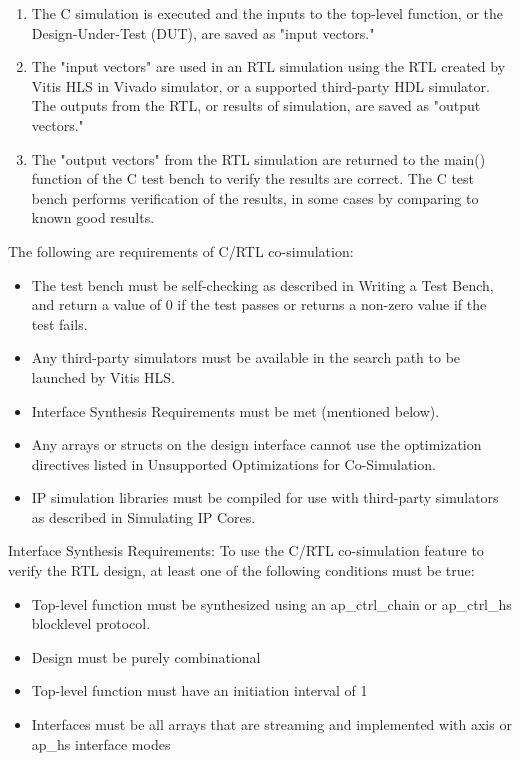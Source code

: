 \begin{enumerate}
  \item The C simulation is executed and the inputs to the top-level function, or the Design-Under-Test (DUT), are saved as "input vectors."
  \item The "input vectors" are used in an RTL simulation using the RTL created by Vitis HLS in Vivado simulator, or a supported third-party HDL simulator. The outputs from the RTL, or results of simulation, are saved as "output vectors."
  \item The "output vectors" from the RTL simulation are returned to the main() function of the C test bench to verify the results are correct. The C test bench performs verification of the results, in some cases by comparing to known good results.
\end{enumerate}

The following are requirements of C/RTL co-simulation:
\begin{itemize}
  \item The test bench must be self-checking as described in Writing a Test Bench, and return a value of 0 if the test passes or returns a non-zero value if the test fails.
  \item Any third-party simulators must be available in the search path to be launched by Vitis HLS.
  \item Interface Synthesis Requirements must be met (mentioned below).
  \item Any arrays or structs on the design interface cannot use the optimization directives listed in Unsupported Optimizations for Co-Simulation.
  \item IP simulation libraries must be compiled for use with third-party simulators as described in Simulating IP Cores.
\end{itemize}

Interface Synthesis Requirements: To use the C/RTL co-simulation feature to verify the RTL design, at least one of the following conditions must be true:
\begin{itemize}
  \item Top-level function must be synthesized using an ap\_ctrl\_chain or ap\_ctrl\_hs blocklevel protocol.
  \item Design must be purely combinational
  \item Top-level function must have an initiation interval of 1
  \item Interfaces must be all arrays that are streaming and implemented with axis or ap\_hs interface modes
\end{itemize}

